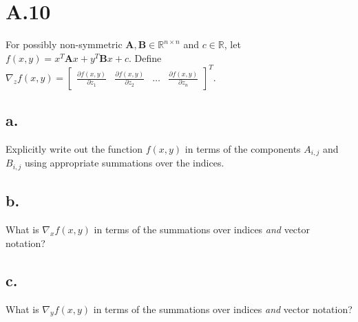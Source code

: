 \documentclass{article}
\newcommand{\field}[1]{\mathbb{#1}}
\newcommand{\1}{\mathbf{1}}
\newcommand{\R}{\field{R}} %
\newcommand{\mat}[1]{\boldsymbol{#1}} %
\begin{document}
\section*{A.10}
{\Large 

For possibly non-symmetric $\mat{A}, \mat{B} \in \R^{n \times n}$ and $c \in \R$, let $f(x, y) = x^T \mat{A} x + y^T \mat{B} x + c$. Define $\nabla_z f(x,y) = \begin{bmatrix} \frac{\partial f(x,y)}{\partial z_1} & \frac{\partial f(x,y)}{\partial z_2} & \dots & \frac{\partial f(x,y)}{\partial z_n} \end{bmatrix}^T$.  

\subsection*{a.}
Explicitly write out the function $f(x, y)$ in terms of the components $A_{i,j}$ and $B_{i,j}$ using appropriate summations over the indices.

\subsection*{b.}
What is $\nabla_x f(x,y)$ in terms of the summations over indices \emph{and} vector notation?

\subsection*{c.}
What is $\nabla_y f(x,y)$ in terms of the summations over indices \emph{and} vector notation?

}
\end{document}
